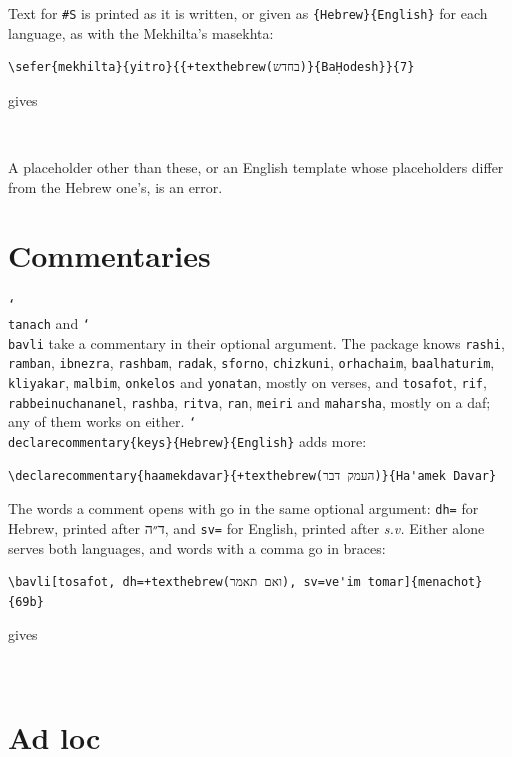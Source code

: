 \documentclass[11pt]{article}
\newcommand{\cs}[1]{\texttt{\char`\\#1}}
\begin{document}
Text for \verb|#S| is printed as it is written, or given as \verb|{Hebrew}{English}| for each
language, as with the Mekhilta's masekhta:
\begin{Verbatim}[commandchars=+\(\)]
\sefer{mekhilta}{yitro}{{+texthebrew(בחדש)}{BaḤodesh}}{7}
\end{Verbatim}
gives
\begin{center}
\\
\texthebrew{}
\end{center}
A placeholder other than these, or an English template whose placeholders differ from the
Hebrew one's, is an error.

\section{Commentaries}\label{sec:commentaries}

\cs{tanach} and \cs{bavli} take a commentary in their optional argument. The package knows
\texttt{rashi}, \texttt{ramban}, \texttt{ibnezra}, \texttt{rashbam}, \texttt{radak},
\texttt{sforno}, \texttt{chizkuni}, \texttt{orhachaim}, \texttt{baalhaturim},
\texttt{kliyakar}, \texttt{malbim}, \texttt{onkelos} and \texttt{yonatan}, mostly on verses,
and \texttt{tosafot}, \texttt{rif}, \texttt{rabbeinuchananel}, \texttt{rashba},
\texttt{ritva}, \texttt{ran}, \texttt{meiri} and \texttt{maharsha}, mostly on a daf; any of
them works on either. \cs{declarecommentary}\verb|{keys}{Hebrew}{English}| adds more:
\begin{Verbatim}[commandchars=+\(\)]
\declarecommentary{haamekdavar}{+texthebrew(העמק דבר)}{Ha'amek Davar}
\end{Verbatim}

The words a comment opens with go in the same optional argument: \texttt{dh=} for Hebrew,
printed after \texthebrew{ד״ה}, and \texttt{sv=} for English, printed after \textit{s.v.}
Either alone serves both languages, and words with a comma go in braces:
\begin{Verbatim}[commandchars=+\(\)]
\bavli[tosafot, dh=+texthebrew(ואם תאמר), sv=ve'im tomar]{menachot}{69b}
\end{Verbatim}
gives
\begin{center}
\\
\texthebrew{}
\end{center}

\section{Ad loc}\label{sec:sham}
\end{document}
